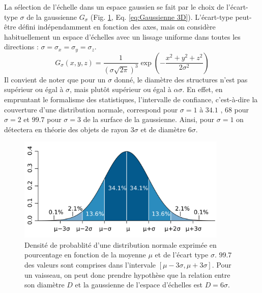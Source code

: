 La sélection de l'échelle dans un espace gaussien se fait par le choix de l'écart-type $\sigma$ de la gaussienne $G_\sigma$ (Fig. \ref{fig:normal_distribution_probability_coverage}, Eq. \ref{eq:Gaussienne 3D}). L'écart-type peut-être défini indépendamment en fonction des axes, mais on considère habituellement un espace d'échelles avec un lissage uniforme dans toutes les directions : $\sigma = \sigma_x = \sigma_y = \sigma_z$. 
\begin{equation}
  G_\sigma(x,y,z) = \frac{1}{ (\sigma\sqrt{2\pi})^3 }\exp(-\frac{x^2 + y^2 + z^2}{2\sigma^2 })
  \label{eq:Gaussienne 3D}
\end{equation}
Il convient de noter que pour un $\sigma$ donné, le diamètre des structures n'est pas supérieur ou égal à $\sigma$, mais plutôt supérieur ou égal à $\alpha\sigma$. En effet, en empruntant le formalisme des statistiques, l'intervalle de confiance, c'est-à-dire la couverture d'une distribution normale, correspond pour $\sigma=1$ à $34.1$ \percent{}, $68$ \percent{}pour $\sigma=2$ et $99.7$ \percent{}pour $\sigma=3$ de la surface de la gaussienne. Ainsi, pour $\sigma=1$ on détectera en théorie des objets de rayon $3\sigma$ et de diamètre $6\sigma$.  
\begin{figure}[!ht]
  \centering
  \includegraphics[height=5cm]{Images/normal_distribution_probability_coverage.png}
  \caption{Densité de probablité d'une distribution normale exprimée en pourcentage en fonction de la moyenne $\mu$ et de l'écart type $\sigma$. $99.7$ \percent{}des valeurs sont comprises dans l'intervale $[\mu-3\sigma,\mu+3\sigma]$. Pour un vaisseau, on peut donc prendre hypothèse que la relation entre son diamètre $D$ et la gaussienne de l'espace d'échelles est $D=6\sigma$.\protect\footnotemark}
  \label{fig:normal_distribution_probability_coverage}
\end{figure}
